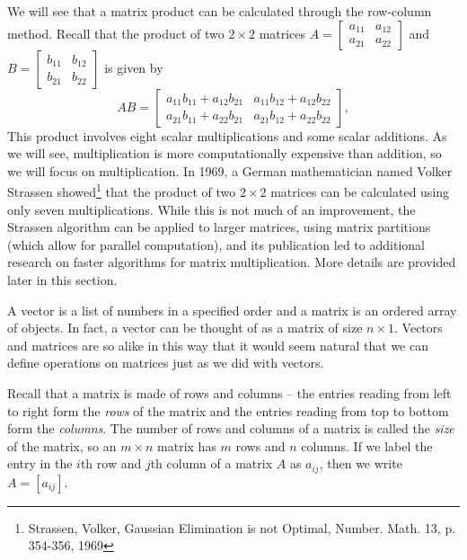 We will see that a matrix product can be calculated through the row-column method. Recall that the product of two $2 \times 2$ matrices $A = \left[ \begin{array}{cc} a_{11}&a_{12}\\a_{21}&a_{22} \end{array} \right]$ and $B = \left[ \begin{array}{cc} b_{11}&b_{12}\\b_{21}&b_{22} \end{array} \right]$ is given by 
\[AB = \left[ \begin{array}{cc} a_{11}b_{11}+a_{12}b_{21} & a_{11}b_{12}+a_{12}b_{22} \\ a_{21}b_{11}+a_{22}b_{21} & a_{21}b_{12}+a_{22}b_{22} \end{array} \right],\]
This product involves eight scalar multiplications and some scalar additions. As we will see, multiplication is more computationally expensive than addition, so we will focus on multiplication. In 1969, a German mathematician named Volker Strassen showed\footnote{Strassen, Volker, Gaussian Elimination is not Optimal, Number. Math. 13, p. 354-356, 1969} that the product of two $2 \times 2$ matrices can be calculated using only seven multiplications. While this is not much of an improvement, the Strassen algorithm can be applied to larger matrices, using matrix partitions (which allow for parallel computation), and its publication led to additional research on faster algorithms for matrix multiplication. More details are provided later in this section. 




A vector is a list of numbers in a specified order and a matrix is an ordered array of objects. In fact, a vector can be thought of as a matrix of size $n \times 1$. Vectors and matrices are so alike in this way that it would seem natural that we can define operations on matrices just as we did with vectors. 

Recall that a matrix is made of rows and columns -- the entries reading from left to right form the \emph{rows} of the matrix and the entries reading from top to bottom form the \emph{columns}. The number of rows and columns of a matrix is called the \emph{size} of the matrix, so an $m \times n$ matrix has $m$ rows and $n$ columns. If we label the entry in the $i$th row and $j$th column of a matrix $A$ as $a_{ij}$, then we write $A = [a_{ij}]$. 

